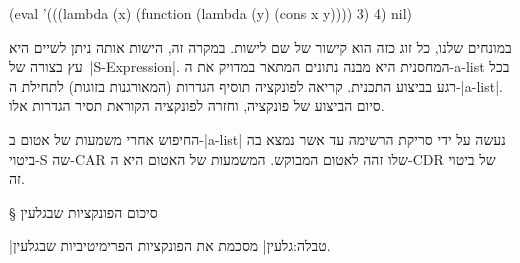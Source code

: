 \documentclass[a4paper,12pt,reqno]{article}
\begin{document}
\begin{LISP}
  (eval '(((lambda (x) (function (lambda (y) (cons x y)))) 3) 4) nil)
\end{LISP}
במונחים שלנו, כל זוג כזה הוא קישור של שם לישות. במקרה זה, הישות אותה ניתן לשיים
היא עץ בצורה של~\E|S-Expression|. המחסנית היא מבנה נתונים המתאר במדויק את
ה-a-list בכל רגע בביצוע התכנית. קריאה לפונקציה תוסיף הגדרות (המאורגנות
בזוגות) לתחילת ה-\E|a-list|. סיום הביצוע של פונקציה, וחזרה לפונקציה הקוראת תסיר
הגדרות אלו.

החיפוש אחרי משמעות של אטום ב-\E|a-list| נעשה על ידי סריקת הרשימה עד אשר נמצא בה
ביטוי-S שה-CAR שלו זהה לאטום המבוקש. המשמעות של האטום היא ה-CDR של ביטוי זה.

\appendix

§ סיכום הפונקציות שבגלעין

|טבלה:גלעין| מסכמת את הפונקציות הפרימיטיביות שבגלעין.
\end{document}
